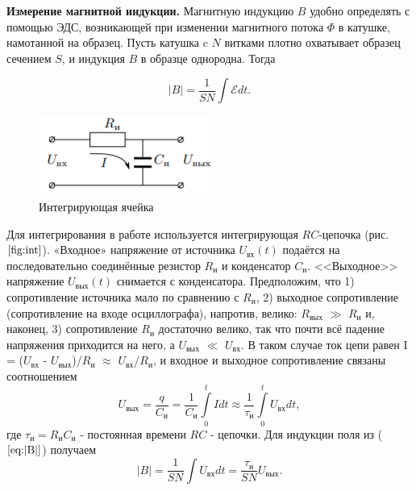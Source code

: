\documentclass[a4paper,12pt]{article} %
\begin{document}
\textbf{Измерение магнитной индукции.} Магнитную индукцию $ B $ удобно
определять с помощью ЭДС, возникающей при изменении магнитного
потока $ \Phi $ в катушке, намотанной на образец. Пусть катушка c $ N $ витками плотно охватывает образец сечением $ S $, и индукция $ B $ в образце
однородна. Тогда

\begin{equation}
  |B|=\frac{1}{SN}\int\mathcal{E} dt.
  \label{eq:|B|}
\end{equation}
\begin{figure}
  \includegraphics[width=\linewidth]{int.png}
  \caption{Интегрирующая ячейка}
  \label{fig:int}
\end{figure}

Для интегрирования в работе используется интегрирующая $ RC $-цепочка (рис. $ \ref{fig:int} $).
«Входное» напряжение от источника $U_{\text{вх}}(t)$ подаётся на последовательно соединённые резистор $R_\text{и}$ и конденсатор $C_\text{и}$. <<Выходное>>
напряжение $U_{\text{вых}}(t)$ снимается с конденсатора. Предположим, что 1) сопротивление источника мало по сравнению с $R_\text{и}$, 2) выходное сопротивление (сопротивление на входе осциллографа), напротив, велико: $R_{\text{вых}}$ $ \gg $ $R_\text{и}$ и, наконец, 3) сопротивление $R_\text{и}$ достаточно велико, так что почти всё падение напряжения приходится на него, а $U_{\text{вых}}$ $\ll$ $U_{\text{вх}}$. В таком случае ток цепи равен I = ($U_{\text{вх}}$ - $U_{\text{вых}}$)/$R_\text{и}$ $\approx$ $U_{\text{вх}}$/$R_\text{и}$, и входное и выходное сопротивление связаны соотношением
\begin{equation}
  U_{\text{вых}} = \frac{q}{C_\text{и}} = \frac{1}{C_\text{и}}\int\limits_0^t Idt \approx \frac{1}{\tau_\text{и}} \int\limits_0^t U_{\text{вх}}dt,
  \label{eq:U_ext}
\end{equation}
где $\tau_\text{и}=R_\text{и}C_\text{и}$ - постоянная времени $ RC $ - цепочки. Для индукции поля из ($\ref{eq:|B|}$) получаем 
\begin{equation}
  |B|=\frac{1}{SN}\int U_{\text{вх}} dt=\frac{\tau_\text{и}}{SN}U_{\text{вых}}.
  \label{eq:|B|new}
\end{equation}
\end{document}
